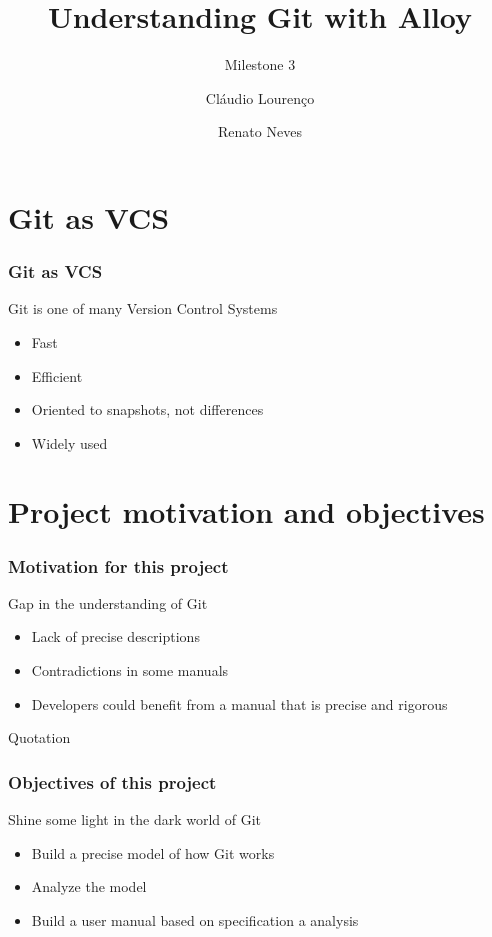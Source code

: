 \documentclass{beamer}
\title{Understanding Git with Alloy}
\subtitle{Milestone 3}
\author{Cláudio Lourenço \and Renato Neves}
\institute{University of Minho\\
Formal Methods in Software Engineering}
\begin{document}
\frame {
   \titlepage
}


\section{Git as VCS}

\begin{frame}
	\frametitle{Git as VCS}
	\begin{block}{Git is one of many Version Control Systems}
		\begin{itemize}
		\item Fast
		\item Efficient
		\item Oriented to snapshots, not differences
		\item Widely used
	\end{itemize}
	\end{block}
\end{frame}

\section{Project motivation and objectives}
\begin{frame}
	\frametitle{Motivation for this project}
	\begin{block}{Gap in the understanding of Git}
		\begin{itemize}
		\item Lack of precise descriptions
		\item Contradictions in some manuals
		\item Developers could benefit from a manual
		that is precise and rigorous
		\end{itemize}
	\end{block}
\end{frame}

\begin{frame}
	Quotation
\end{frame}

\begin{frame}
	\frametitle{Objectives of this project}
	\begin{block}{Shine some light in the dark world of Git}
		\begin{itemize}
			\item Build a precise model of how Git works
			\item Analyze the model
			\item Build a user manual based on specification a
			analysis 
		\end{itemize}
	\end{block}
\end{frame}
\end{document}
